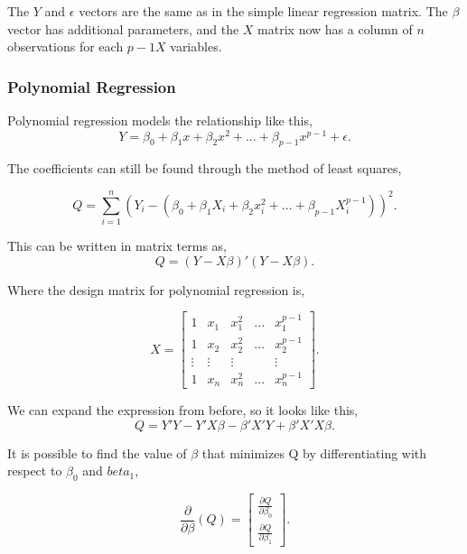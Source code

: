 \noindent The $Y$ and $\epsilon$ vectors are the same as in the simple linear regression matrix. The $\beta$ vector has additional parameters, and the $X$ matrix now has a column of $n$ observations for each $p-1 X$ variables. 

\subsubsection{Polynomial Regression}
Polynomial regression models the relationship like this, 
\begin{equation}
	Y=\beta_0 + \beta_1 x + \beta_2 x^2	+ ... + \beta_{p-1} x^{p-1}+ \epsilon .
	\end{equation}

\noindent The coefficients can still be found through the method of least squares,

\begin{equation}
	Q=\sum_{i=1}^{n}(Y_i -(\beta_0 + \beta_1 X_i + \beta_2 x_i^2 + ... + \beta_{p-1}X_{i}^{p-1}))^2 .
\end{equation}
\newline

\noindent This can be written in matrix terms as,
\begin{equation}
	Q=(Y-X\beta)' (Y-X\beta). 
\end{equation}

\noindent Where the design matrix for polynomial regression is, 

\begin{equation}
	 X=
\left[
\begin{array}{ccccc}
	1&x_1&x_1^2&...&x_1^{p-1}\\ 
	1&x_2&x_2^2&...&x_2^{p-1} \\
	\vdots & \vdots &\vdots &&\vdots\\
	1&x_n&x_n^2&...&x_n^{p-1} 
\end{array}
\right].
\end{equation}

\noindent We can expand the expression from before, so it looks like this,
\begin{equation}
	Q=Y' Y -Y' X \beta -\beta' X' Y + \beta' X' X \beta .
\end{equation}


\noindent It is possible to find the value of $\beta$ that minimizes Q by differentiating with respect to $\beta_0$ and $beta_1$,

\begin{equation}
\frac{\partial}{\partial \beta}(Q)=
\left[
\begin{array}{c}
	\frac{\partial Q}{\partial \beta_0}\\ 
	\frac{\partial Q}{\partial \beta_1}
\end{array}
\right].
\end{equation}

